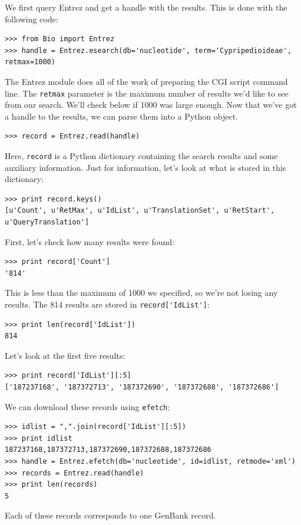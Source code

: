 \documentclass{report}
\begin{document}
We first query Entrez and get a handle with the results. This is done with the following code:
\begin{verbatim}
>>> from Bio import Entrez
>>> handle = Entrez.esearch(db='nucleotide', term='Cypripedioideae', retmax=1000)
\end{verbatim}
The Entrez module does all of the work of preparing the CGI script command line. The \verb+retmax+ parameter is the maximum number of results we'd like to see from our search. We'll check below if 1000 was large enough.
Now that we've got a handle to the results, we can parse them into a Python object.
\begin{verbatim}
>>> record = Entrez.read(handle)
\end{verbatim}
Here, \verb+record+ is a Python dictionary containing the search results and some auxiliary information. Just for information, let's look at what is stored in this dictionary:
\begin{verbatim}
>>> print record.keys()
[u'Count', u'RetMax', u'IdList', u'TranslationSet', u'RetStart', u'QueryTranslation']
\end{verbatim}
First, let's check how many results were found:
\begin{verbatim}
>>> print record['Count']
'814'
\end{verbatim}
This is less than the maximum of 1000 we specified, so we're not losing any results. The 814 results are stored in \verb+record['IdList']+:
\begin{verbatim}
>>> print len(record['IdList'])
814
\end{verbatim}
Let's look at the first five results:
\begin{verbatim}
>>> print record['IdList'][:5]
['187237168', '187372713', '187372690', '187372688', '187372686']
\end{verbatim}
We can download these records using \verb+efetch+:
\begin{verbatim}
>>> idlist = ",".join(record['IdList'][:5])
>>> print idlist
187237168,187372713,187372690,187372688,187372686
>>> handle = Entrez.efetch(db='nucleotide', id=idlist, retmode='xml')
>>> records = Entrez.read(handle)
>>> print len(records)
5
\end{verbatim}
Each of these records corresponds to one GenBank record.
\end{document}
